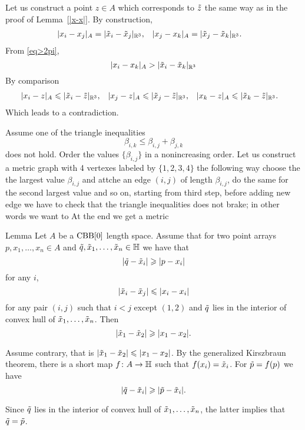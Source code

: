 Let us construct a point $z\in A$ which corresponds to $\~z$ the same way as in the proof of Lemma~\ref{|x-x|}.
By construction, 
\begin{align*}
|x_i-x_j|_A &= |\~x_i-\~x_j|_{\RR^3},
&
|x_j-x_k|_A &= |\~x_j-\~x_k|_{\RR^3}.
\end{align*}
From \ref{eq>2pi},
\[|x_i-x_k|_A > |\~x_i-\~x_k|_{\RR^3}\]
By comparison
\begin{align*}
|x_i-z|_A &\le |\~x_i-\~z|_{\RR^3},
&
|x_j-z|_A &\le |\~x_j-\~z|_{\RR^3},
&
|x_k-z|_A &\le |\~x_k-\~z|_{\RR^3}.
\end{align*}
Which leads to a contradiction. %
\qeds


Assume one of the triangle inequalities 
\[\beta_{i,k}\le \beta_{i,j}+\beta_{j,k}\]
does not hold.
Order the values $\{\beta_{i,j}\}$ in a nonincreasing order.
Let us construct a metric graph with 4 vertexes labeled by $\{1,2,3,4\}$
the following way choose the the largest value $\beta_{i,j}$ 
and attche an edge $(i,j)$ of length $\beta_{i,j}$,
do the same for the second largest value and so on,
starting from third step, before adding new edge we have to check that the triangle inequalities does not brake; in other words we want to 
At the end we get a metric 
\qeds

\begin{thm}{Lemma}
Let $A$ be a $\CBB[0]$ length space.
Assume that for two point arrays $p,x_1,\dots,x_n\in A$ and $\~q, \~x_1,\dots,\~x_n\in \HH$ we have that 
\[|\~q-\~x_i|\ge |p-x_i|\]
for any $i$,
\[|\~x_i-\~x_j|\le |x_i-x_i|\]
for any pair $(i,j)$ such that $i<j$ except $(1,2)$
and $\~q$ lies in the interior of convex hull of $\~x_1,\dots,\~x_n$.
Then 
\[|\~x_1-\~x_2|\ge |x_1-x_2|.\]
\end{thm}

Assume contrary, that is $|\~x_1-\~x_2|\le |x_1-x_2|$.
By the generalized Kirszbraun theorem, there is a short map $f\:A\to \HH$
such that $f(x_i)=\~x_i$.
For  $\~p=f(p)$ we have
\[|\~q-\~x_i|\ge |\~p-\~x_i|.\]

Since $\~q$ lies in the interior of convex hull of $\~x_1,\dots,\~x_n$,
the latter implies that $\~q=\~p$.
\qeds
